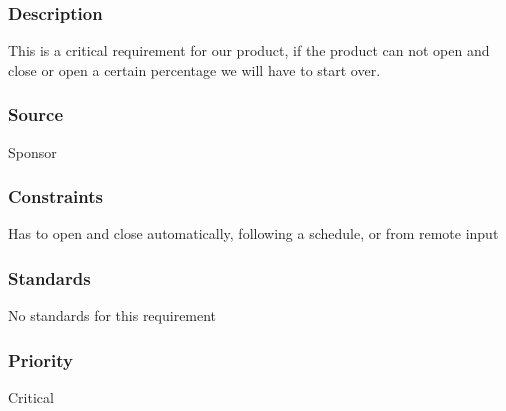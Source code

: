 \subsubsection{Description}
This is a critical requirement for our product, if the product can not open and close or open a certain percentage we will have to start over.

\subsubsection{Source}
Sponsor
\subsubsection{Constraints}
Has to open and close automatically, following a schedule, or from remote input 

\subsubsection{Standards}
No standards for this requirement
\subsubsection{Priority}
Critical



